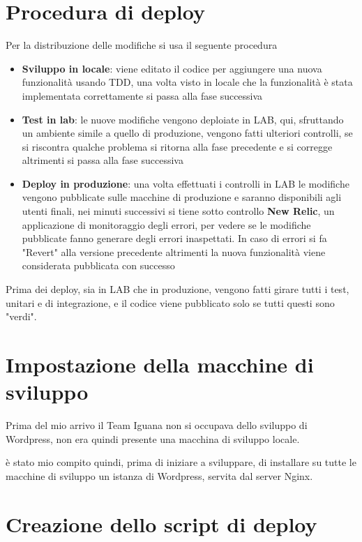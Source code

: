 \section{Procedura di deploy}
Per la distribuzione delle modifiche si usa il seguente procedura
\begin{itemize}
\item {\bf Sviluppo in locale}: viene editato il codice per aggiungere una nuova funzionalità usando
TDD, una volta visto in locale che la funzionalità è stata implementata correttamente si passa alla fase successiva
\item {\bf Test in lab}: le nuove modifiche vengono deploiate in LAB, qui, sfruttando un ambiente simile a quello di 
produzione, vengono fatti ulteriori controlli, se si riscontra qualche problema si ritorna alla fase precedente e si corregge
altrimenti si passa alla fase successiva 
\item {\bf Deploy in produzione}: una volta effettuati i controlli in LAB le modifiche vengono pubblicate sulle macchine
di produzione e saranno disponibili agli utenti finali, nei minuti successivi si tiene sotto controllo {\bf New Relic}, un
applicazione di monitoraggio degli errori, per vedere se le modifiche pubblicate fanno generare degli errori inaspettati.
In caso di errori si fa "Revert" alla versione precedente altrimenti la nuova funzionalità viene considerata pubblicata con successo
\end{itemize}

Prima dei deploy, sia in LAB che in produzione, vengono fatti girare tutti i test, unitari e di integrazione, e il codice viene pubblicato solo se tutti questi sono "verdi".

\section{Impostazione della macchine di sviluppo}

Prima del mio arrivo il Team Iguana non si occupava dello sviluppo di Wordpress, non era quindi presente
una macchina di sviluppo locale.

è stato mio compito quindi, prima di iniziare a sviluppare, di installare su tutte le macchine di sviluppo
un istanza di Wordpress, servita dal server Nginx.


\section{Creazione dello script di deploy}